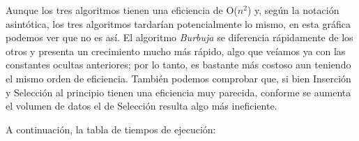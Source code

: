 \documentclass[11pt,a4paper]{article}
\begin{document}
				\par
				Aunque los tres algoritmos tienen una eficiencia de O($n^2$) y, según la notación asintótica, los tres algoritmos tardarían potencialmente lo mismo, en esta gráfica podemos ver que no es así. El algoritmo \textit{Burbuja} se diferencia rápidamente de los otros y presenta un crecimiento mucho más rápido, algo que veíamos ya con las constantes ocultas anteriores; por lo tanto, es bastante más costoso aun teniendo el mismo orden de eficiencia. También podemos comprobar que, si bien Inserción y Selección al principio tienen una eficiencia muy parecida, conforme se aumenta el volumen de datos el de Selección resulta algo más ineficiente.

\newpage

				\par
				A continuación, la tabla de tiempos de ejecución:
\end{document}
